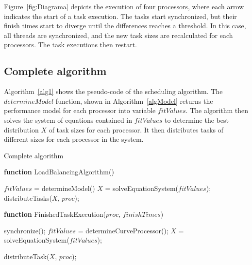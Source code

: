 \documentclass[journal]{IEEEtran}
\begin{document}
Figure~\ref{fig:Diagrama} depicts the execution of four processors, where
each arrow indicates the start of a task execution. The tasks start
synchronized, but their finish times start to diverge until the differences
reaches a threshold. In this case, all threads are synchronized, and the new
task sizes are recalculated for each processors. The task executions then
restart.

\subsection{Complete algorithm}
Algorithm~\ref{alg1} shows the pseudo-code of the scheduling algorithm. The
$determineModel$ function, shown in Algorithm~\ref{algModel} returns the
performance model for each processor into variable $fitValues$. The algorithm
then solves the system of equations contained in $fitValues$ to determine the
best distribution $X$ of task sizes for each processor. It then distributes
tasks of different sizes for each processor in the system.

\begin{algorithm}

\caption{Complete algorithm}
\label{alg1}

\begin{algorithmic}		

\STATE \textbf{function} LoadBalancingAlgorithm()

\STATE $fitValues$ = determineModel()
\STATE $X$ = solveEquationSystem($fitValues$);
  \STATE distributeTasks($X$, $proc$);
\ENDFOR
\end{algorithmic}

\vspace{0.2cm}

\begin{algorithmic}		
\STATE \textbf{function} FinishedTaskExecution($proc$, $finishTimes$)


		\STATE synchronize();
		\STATE $fitValues$ = determineCurveProcessor();
        \STATE $X$ = solveEquationSystem($fitValues$);
    \ENDIF
        
	\STATE distributeTask($X$, $proc$);
    
\ENDIF


\end{algorithmic}
\end{algorithm}
\end{document}
